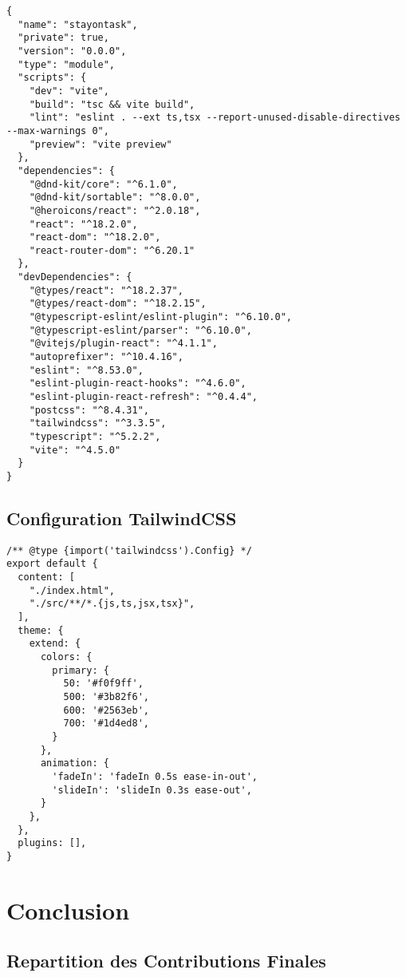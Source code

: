 \documentclass[12pt,a4paper]{article}
\begin{document}
\begin{lstlisting}[caption=package.json - Dependances du projet]
{
  "name": "stayontask",
  "private": true,
  "version": "0.0.0",
  "type": "module",
  "scripts": {
    "dev": "vite",
    "build": "tsc && vite build",
    "lint": "eslint . --ext ts,tsx --report-unused-disable-directives --max-warnings 0",
    "preview": "vite preview"
  },
  "dependencies": {
    "@dnd-kit/core": "^6.1.0",
    "@dnd-kit/sortable": "^8.0.0",
    "@heroicons/react": "^2.0.18",
    "react": "^18.2.0",
    "react-dom": "^18.2.0",
    "react-router-dom": "^6.20.1"
  },
  "devDependencies": {
    "@types/react": "^18.2.37",
    "@types/react-dom": "^18.2.15",
    "@typescript-eslint/eslint-plugin": "^6.10.0",
    "@typescript-eslint/parser": "^6.10.0",
    "@vitejs/plugin-react": "^4.1.1",
    "autoprefixer": "^10.4.16",
    "eslint": "^8.53.0",
    "eslint-plugin-react-hooks": "^4.6.0",
    "eslint-plugin-react-refresh": "^0.4.4",
    "postcss": "^8.4.31",
    "tailwindcss": "^3.3.5",
    "typescript": "^5.2.2",
    "vite": "^4.5.0"
  }
}
\end{lstlisting}

\subsection{Configuration TailwindCSS}

\begin{lstlisting}[caption=tailwind.config.js - Configuration CSS]
/** @type {import('tailwindcss').Config} */
export default {
  content: [
    "./index.html",
    "./src/**/*.{js,ts,jsx,tsx}",
  ],
  theme: {
    extend: {
      colors: {
        primary: {
          50: '#f0f9ff',
          500: '#3b82f6',
          600: '#2563eb',
          700: '#1d4ed8',
        }
      },
      animation: {
        'fadeIn': 'fadeIn 0.5s ease-in-out',
        'slideIn': 'slideIn 0.3s ease-out',
      }
    },
  },
  plugins: [],
}
\end{lstlisting}

\section{Conclusion}

\subsection{Repartition des Contributions Finales}
\end{document}
